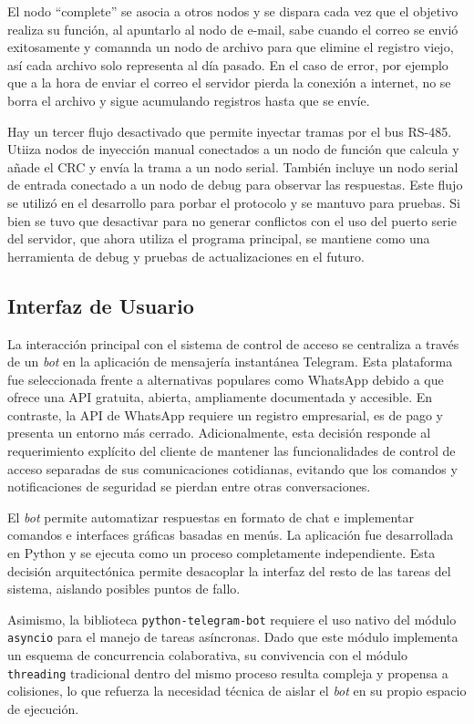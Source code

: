El nodo \enquote{complete} se asocia a otros nodos y se dispara cada vez que el objetivo realiza su función, al apuntarlo al nodo de e-mail, sabe cuando el correo se envió exitosamente y comannda un nodo de archivo para que elimine el registro viejo, así cada archivo solo representa al día pasado. En el caso de error, por ejemplo que a la hora de enviar el correo el servidor pierda la conexión a internet, no se borra el archivo y sigue acumulando registros hasta que se envíe.

Hay un tercer flujo desactivado que permite inyectar tramas por el bus RS-485. Utiiza nodos de inyección manual conectados a un nodo de función que calcula y añade el CRC y envía la trama a un nodo serial. También incluye un nodo serial de entrada conectado a un nodo de debug para observar las respuestas. Este flujo se utilizó en el desarrollo para porbar el protocolo y se mantuvo para pruebas. Si bien se tuvo que desactivar para no generar conflictos con el uso del puerto serie del servidor, que ahora utiliza el programa principal, se mantiene como una herramienta de debug y pruebas de actualizaciones en el futuro.


\subsection{Interfaz de Usuario}

La interacción principal con el sistema de control de acceso se centraliza a través de un \textit{bot} en la aplicación de mensajería instantánea Telegram. Esta plataforma fue seleccionada frente a alternativas populares como WhatsApp debido a que ofrece una API gratuita, abierta, ampliamente documentada y accesible. En contraste, la API de WhatsApp requiere un registro empresarial, es de pago y presenta un entorno más cerrado. Adicionalmente, esta decisión responde al requerimiento explícito del cliente de mantener las funcionalidades de control de acceso separadas de sus comunicaciones cotidianas, evitando que los comandos y notificaciones de seguridad se pierdan entre otras conversaciones.

El \textit{bot} permite automatizar respuestas en formato de chat e implementar comandos e interfaces gráficas basadas en menús. La aplicación fue desarrollada en Python y se ejecuta como un proceso completamente independiente. Esta decisión arquitectónica permite desacoplar la interfaz del resto de las tareas del sistema, aislando posibles puntos de fallo. 

Asimismo, la biblioteca \texttt{python-telegram-bot} requiere el uso nativo del módulo \texttt{asyncio} para el manejo de tareas asíncronas. Dado que este módulo implementa un esquema de concurrencia colaborativa, su convivencia con el módulo \texttt{threading} tradicional dentro del mismo proceso resulta compleja y propensa a colisiones, lo que refuerza la necesidad técnica de aislar el \textit{bot} en su propio espacio de ejecución.


